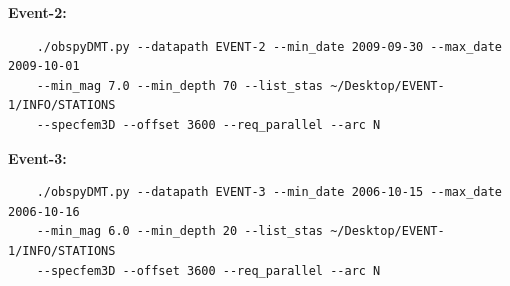 \documentclass{article}
\begin{document}
\textbf{Event-2:}

\begin{verbatim}
    ./obspyDMT.py --datapath EVENT-2 --min_date 2009-09-30 --max_date 2009-10-01 
    --min_mag 7.0 --min_depth 70 --list_stas ~/Desktop/EVENT-1/INFO/STATIONS 
    --specfem3D --offset 3600 --req_parallel --arc N
\end{verbatim}

\textbf{Event-3:}

\begin{verbatim}
    ./obspyDMT.py --datapath EVENT-3 --min_date 2006-10-15 --max_date 2006-10-16 
    --min_mag 6.0 --min_depth 20 --list_stas ~/Desktop/EVENT-1/INFO/STATIONS 
    --specfem3D --offset 3600 --req_parallel --arc N
\end{verbatim}


\newpage
\end{document}
